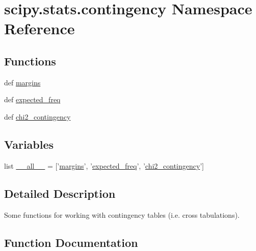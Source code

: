 \hypertarget{namespacescipy_1_1stats_1_1contingency}{}\section{scipy.\+stats.\+contingency Namespace Reference}
\label{namespacescipy_1_1stats_1_1contingency}
\subsection*{Functions}
\begin{DoxyCompactItemize}
\item 
def \hyperlink{namespacescipy_1_1stats_1_1contingency_ad1d41e0e88befdc8fbcaf5f125a1c9cc}{margins}
\item 
def \hyperlink{namespacescipy_1_1stats_1_1contingency_a84febdb243bbea51540c0eb369bf0359}{expected\+\_\+freq}
\item 
def \hyperlink{namespacescipy_1_1stats_1_1contingency_a102b9083711d1cb815144fe68da18da0}{chi2\+\_\+contingency}
\end{DoxyCompactItemize}
\subsection*{Variables}
\begin{DoxyCompactItemize}
\item 
list \hyperlink{namespacescipy_1_1stats_1_1contingency_a28259016d52818d1523cf2cd7dcc85ca}{\+\_\+\+\_\+all\+\_\+\+\_\+} = \mbox{[}'\hyperlink{namespacescipy_1_1stats_1_1contingency_ad1d41e0e88befdc8fbcaf5f125a1c9cc}{margins}', '\hyperlink{namespacescipy_1_1stats_1_1contingency_a84febdb243bbea51540c0eb369bf0359}{expected\+\_\+freq}', '\hyperlink{namespacescipy_1_1stats_1_1contingency_a102b9083711d1cb815144fe68da18da0}{chi2\+\_\+contingency}'\mbox{]}
\end{DoxyCompactItemize}


\subsection{Detailed Description}
\begin{DoxyVerb}Some functions for working with contingency tables (i.e. cross tabulations).
\end{DoxyVerb}
 

\subsection{Function Documentation}
\hypertarget{namespacescipy_1_1stats_1_1contingency_a102b9083711d1cb815144fe68da18da0}{}

